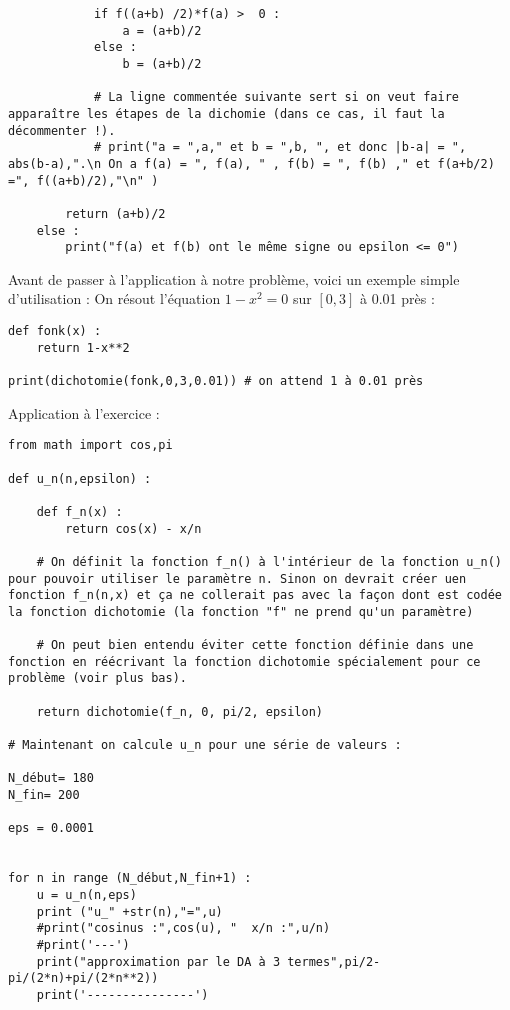 \begin{correction}
\begin{verbatim}
            if f((a+b) /2)*f(a) >  0 :
                a = (a+b)/2
            else :
                b = (a+b)/2

            # La ligne commentée suivante sert si on veut faire apparaître les étapes de la dichomie (dans ce cas, il faut la décommenter !).
            # print("a = ",a," et b = ",b, ", et donc |b-a| = ", abs(b-a),".\n On a f(a) = ", f(a), " , f(b) = ", f(b) ," et f(a+b/2) =", f((a+b)/2),"\n" )

        return (a+b)/2
    else :
        print("f(a) et f(b) ont le même signe ou epsilon <= 0")
\end{verbatim}


	\nipuce Avant de passer à l'application à notre problème, voici un exemple simple d'utilisation : On résout l'équation $1-x^2=0$ sur $[0,3]$ à 0.01 près :

	\begin{verbatim}
def fonk(x) :
    return 1-x**2

print(dichotomie(fonk,0,3,0.01)) # on attend 1 à 0.01 près
\end{verbatim}

	\nipuce  Application à l'exercice :
	\begin{verbatim}
from math import cos,pi

def u_n(n,epsilon) :

    def f_n(x) :
        return cos(x) - x/n

    # On définit la fonction f_n() à l'intérieur de la fonction u_n() pour pouvoir utiliser le paramètre n. Sinon on devrait créer uen fonction f_n(n,x) et ça ne collerait pas avec la façon dont est codée la fonction dichotomie (la fonction "f" ne prend qu'un paramètre)

    # On peut bien entendu éviter cette fonction définie dans une fonction en réécrivant la fonction dichotomie spécialement pour ce problème (voir plus bas).

    return dichotomie(f_n, 0, pi/2, epsilon)

# Maintenant on calcule u_n pour une série de valeurs :

N_début= 180
N_fin= 200

eps = 0.0001


for n in range (N_début,N_fin+1) :
    u = u_n(n,eps)
    print ("u_" +str(n),"=",u)
    #print("cosinus :",cos(u), "  x/n :",u/n)
    #print('---')
    print("approximation par le DA à 3 termes",pi/2-pi/(2*n)+pi/(2*n**2))
    print('---------------')
\end{verbatim}




\end{correction}
